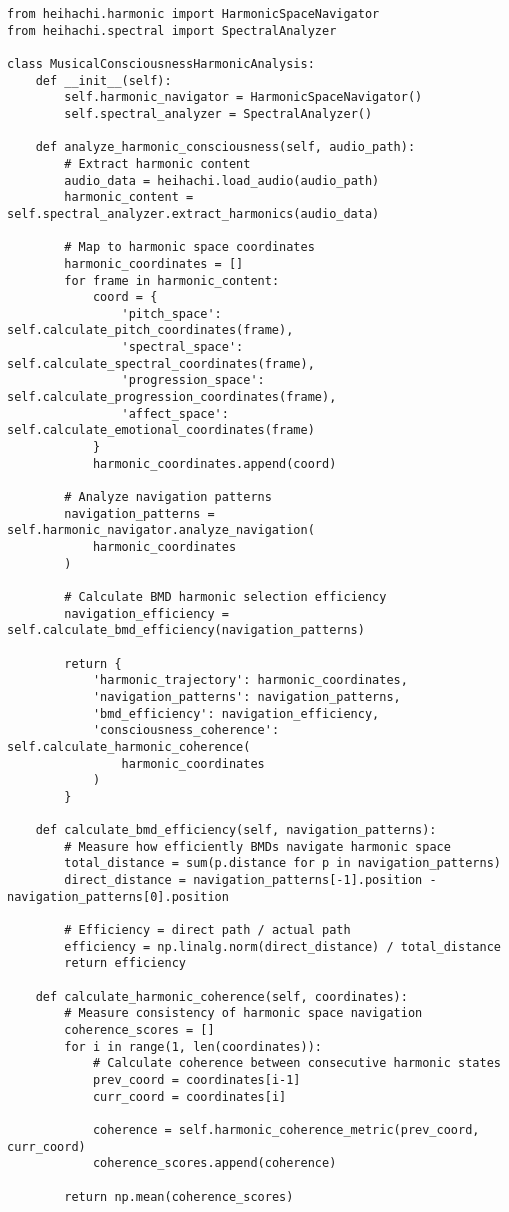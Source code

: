 \documentclass[12pt,a4paper]{article}
\begin{document}
\begin{lstlisting}[style=pythonstyle, caption=Harmonic Space Navigation Analysis]
from heihachi.harmonic import HarmonicSpaceNavigator
from heihachi.spectral import SpectralAnalyzer

class MusicalConsciousnessHarmonicAnalysis:
    def __init__(self):
        self.harmonic_navigator = HarmonicSpaceNavigator()
        self.spectral_analyzer = SpectralAnalyzer()
        
    def analyze_harmonic_consciousness(self, audio_path):
        # Extract harmonic content
        audio_data = heihachi.load_audio(audio_path)
        harmonic_content = self.spectral_analyzer.extract_harmonics(audio_data)
        
        # Map to harmonic space coordinates
        harmonic_coordinates = []
        for frame in harmonic_content:
            coord = {
                'pitch_space': self.calculate_pitch_coordinates(frame),
                'spectral_space': self.calculate_spectral_coordinates(frame),
                'progression_space': self.calculate_progression_coordinates(frame),
                'affect_space': self.calculate_emotional_coordinates(frame)
            }
            harmonic_coordinates.append(coord)
        
        # Analyze navigation patterns
        navigation_patterns = self.harmonic_navigator.analyze_navigation(
            harmonic_coordinates
        )
        
        # Calculate BMD harmonic selection efficiency
        navigation_efficiency = self.calculate_bmd_efficiency(navigation_patterns)
        
        return {
            'harmonic_trajectory': harmonic_coordinates,
            'navigation_patterns': navigation_patterns,
            'bmd_efficiency': navigation_efficiency,
            'consciousness_coherence': self.calculate_harmonic_coherence(
                harmonic_coordinates
            )
        }
    
    def calculate_bmd_efficiency(self, navigation_patterns):
        # Measure how efficiently BMDs navigate harmonic space
        total_distance = sum(p.distance for p in navigation_patterns)
        direct_distance = navigation_patterns[-1].position - navigation_patterns[0].position
        
        # Efficiency = direct path / actual path
        efficiency = np.linalg.norm(direct_distance) / total_distance
        return efficiency
    
    def calculate_harmonic_coherence(self, coordinates):
        # Measure consistency of harmonic space navigation
        coherence_scores = []
        for i in range(1, len(coordinates)):
            # Calculate coherence between consecutive harmonic states
            prev_coord = coordinates[i-1]
            curr_coord = coordinates[i]
            
            coherence = self.harmonic_coherence_metric(prev_coord, curr_coord)
            coherence_scores.append(coherence)
        
        return np.mean(coherence_scores)
\end{lstlisting}
\end{document}
